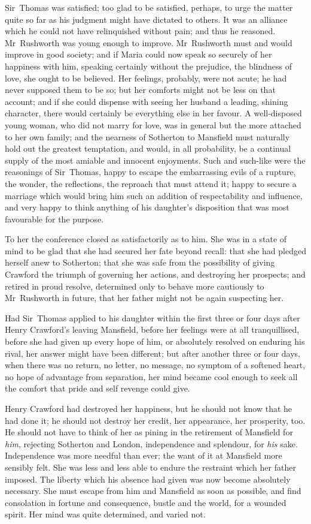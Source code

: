 Sir~Thomas was satisfied; too glad to be satisfied, perhaps, to urge the matter quite so far as his judgment might have dictated to others. It was an alliance which he could not have relinquished without pain; and thus he reasoned. Mr~Rushworth was young enough to improve. Mr~Rushworth must and would improve in good society; and if Maria could now speak so securely of her happiness with him, speaking certainly without the prejudice, the blindness of love, she ought to be believed. Her feelings, probably, were not acute; he had never supposed them to be so; but her comforts might not be less on that account; and if she could dispense with seeing her husband a leading, shining character, there would certainly be everything else in her favour. A well-disposed young woman, who did not marry for love, was in general but the more attached to her own family; and the nearness of Sotherton to Mansfield must naturally hold out the greatest temptation, and would, in all probability, be a continual supply of the most amiable and innocent enjoyments. Such and such-like were the reasonings of Sir~Thomas, happy to escape the embarrassing evils of a rupture, the wonder, the reflections, the reproach that must attend it; happy to secure a marriage which would bring him such an addition of respectability and influence, and very happy to think anything of his daughter's disposition that was most favourable for the purpose.

To her the conference closed as satisfactorily as to him. She was in a state of mind to be glad that she had secured her fate beyond recall: that she had pledged herself anew to Sotherton; that she was safe from the possibility of giving Crawford the triumph of governing her actions, and destroying her prospects; and retired in proud resolve, determined only to behave more cautiously to Mr~Rushworth in future, that her father might not be again suspecting her.

Had Sir~Thomas applied to his daughter within the first three or four days after Henry Crawford's leaving Mansfield, before her feelings were at all tranquillised, before she had given up every hope of him, or absolutely resolved on enduring his rival, her answer might have been different; but after another three or four days, when there was no return, no letter, no message, no symptom of a softened heart, no hope of advantage from separation, her mind became cool enough to seek all the comfort that pride and self revenge could give.

Henry Crawford had destroyed her happiness, but he should not know that he had done it; he should not destroy her credit, her appearance, her prosperity, too. He should not have to think of her as pining in the retirement of Mansfield for \textit{him}, rejecting Sotherton and London, independence and splendour, for \textit{his}  sake. Independence was more needful than ever; the want of it at Mansfield more sensibly felt. She was less and less able to endure the restraint which her father imposed. The liberty which his absence had given was now become absolutely necessary. She must escape from him and Mansfield as soon as possible, and find consolation in fortune and consequence, bustle and the world, for a wounded spirit. Her mind was quite determined, and varied not.

